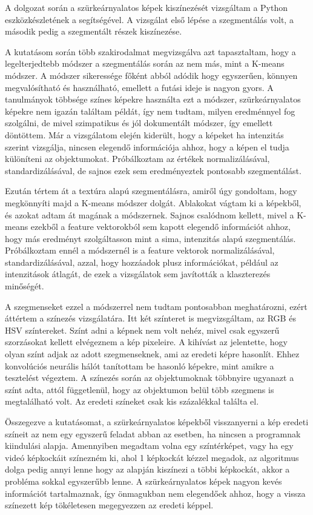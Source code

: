 
A dolgozat során a szürkeárnyalatos képek kiszínezését vizsgáltam a Python eszközkészletének a segítségével. A vizsgálat első lépése a szegmentálás volt, a második pedig a szegmentált részek kiszínezése. 

A kutatásom során több szakirodalmat megvizsgálva azt tapasztaltam, hogy a legelterjedtebb módszer a szegmentálás során az nem más, mint a K-means módszer. A módszer sikeressége főként abból adódik hogy egyszerűen, könnyen megvalósítható és használható, emellett a futási ideje is nagyon gyors. A tanulmányok többsége színes képekre használta ezt a módszer, szürkeárnyalatos képekre nem igazán találtam példát, így nem tudtam, milyen eredménnyel fog szolgálni, de mivel szimpatikus és jól dokumentált módszer, így emellett döntöttem. Már a vizsgálatom elején kiderült, hogy a képeket ha intenzitás szerint vizsgálja, nincsen elegendő információja ahhoz, hogy a képen el tudja különíteni az objektumokat. Próbálkoztam az értékek normalizálásával, standardizálásával, de sajnos ezek sem eredményeztek pontosabb szegmentálást.

Ezután tértem át a textúra alapú szegmentálásra, amiről úgy gondoltam, hogy megkönnyíti majd a K-means módszer dolgát. Ablakokat vágtam ki a képekből, és azokat adtam át magának a módszernek. Sajnos csalódnom kellett, mivel a K-means ezekből a feature vektorokból sem kapott elegendő információt ahhoz, hogy más eredményt szolgáltasson mint a sima, intenzitás alapú szegmentálás. Próbálkoztam ennél a módszernél is a feature vektorok normalizálásával, standardizálásával, azzal, hogy hozzáadok plusz információkat, például az intenzitások átlagát, de ezek a vizsgálatok sem javították a klaszterezés minőségét.

A szegmenseket ezzel a módszerrel nem tudtam pontosabban meghatározni, ezért áttértem a színezés vizsgálatára. Itt két színteret is megvizsgáltam, az RGB és HSV színtereket. Színt adni a képnek nem volt nehéz, mivel csak egyszerű szorzásokat kellett elvégeznem a kép pixeleire. A kihívást az jelentette, hogy olyan színt adjak az adott szegmenseknek, ami az eredeti képre hasonlít. Ehhez konvolúciós neurális hálót tanítottam be hasonló képekre, mint amikre a tesztelést végeztem. A színezés során az objektumoknak többnyire ugyanazt a színt adta, attól függetlenül, hogy az objektumon belül több szegmens is megtalálható volt. Az eredeti színeket csak kis százalékkal találta el. 

Összegezve a kutatásomat, a szürkeárnyalatos képekből visszanyerni a kép eredeti színeit az nem egy egyszerű feladat abban az esetben, ha nincsen a programnak kiindulási alapja. Amennyiben megadtam volna egy színtérképet, vagy ha egy videó képkockáit színezném ki, ahol 1 képkockát kézzel megadok, az algoritmus dolga pedig annyi lenne hogy az alapján kiszínezi a többi képkockát, akkor a probléma sokkal egyszerűbb lenne. A szürkeárnyalatos képek nagyon kevés információt tartalmaznak, így önmagukban nem elegendőek ahhoz, hogy a vissza színezett kép tökéletesen megegyezzen az eredeti képpel. 


